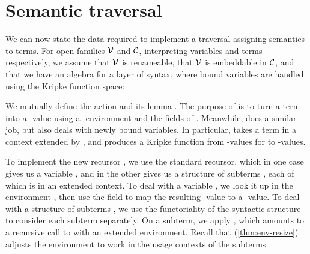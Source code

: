 
\section{Semantic traversal}\label{sec:traversal}

We can now state the data required to implement a traversal assigning
semantics to terms. For open families $\V$ and $\C$, interpreting
variables and terms respectively, we assume that $\V$ is renameable,
that $\V$ is embeddable in $\C$, and that we have an algebra for a
layer of syntax, where bound variables are handled using the Kripke
function space:




We mutually define the action  and its lemma
.
The purpose of  is to turn a term into a
\AgdaBound{$\C$}-value using a \AgdaBound{$\V$}-environment and the fields of
.
Meanwhile,  does a similar job, but also deals with
newly bound variables.
In particular,  takes a term in a context extended by
\AgdaBound{$\Theta$}, and produces a Kripke function from
\AgdaBound{$\V$}-values for \AgdaBound{$\Theta$} to \AgdaBound{$\C$}-values.


To implement the new recursor , we use the standard
recursor, which in one case gives us a variable , and in the other
gives us a structure of subterms , each of which is in an extended
context.
To deal with a variable , we look it
up in the environment \AgdaBound{$\rho$}, then use the
 field to map the resulting
\AgdaBound{$\V$}-value to a \AgdaBound{$\C$}-value.
To deal with a structure of subterms , we use the functoriality of
the syntactic structure to consider each subterm separately.
On a subterm, we apply , which amounts to a recursive call
to  with an extended environment.
Recall that  (\cref{thm:env-resize}) adjusts the
environment \AgdaBound{$\rho$} to work in the usage contexts of the subterms.

